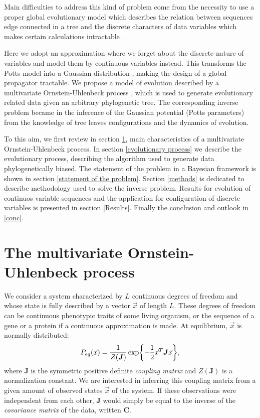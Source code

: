 \documentclass[preprint,amsmath,amssymb,superscriptaddress,showpacs,pre]{revtex4-1}
\let\originalleft\left
\let\originalright\right
\renewcommand{\left}{\mathopen{}\mathclose\bgroup\originalleft}
\renewcommand{\right}{\aftergroup\egroup\originalright}
\def\vx{\vec x}
\newcommand{\curlynormal}[1]{\exp\left\{-\frac{1}{2} #1 \right\}}
\begin{document}
Main difficulties to address  this kind of problem  come from the necessity to use  a proper global evolutionary model which describes the relation between sequences edge connected in a tree and the discrete  characters of data variables which makes certain calculations intractable \cite{entropy_paper}. 

Here we  adopt an approximation where we forget about the discrete nature of variables and model them by continuous variables instead. This transforms the Potts model into a Gaussian distribution \cite{Baldassi}, making the design of a global propagator tractable. We propose a model of evolution described by a multivariate Ornstein-Uhlenbeck process \cite{gardiner}, which is used  to generate evolutionary related data given an arbitrary phylogenetic tree. The corresponding inverse problem became in the inference of the Gaussian potential (Potts parameters) from the knowledge of tree leaves configurations and the dynamics of evolution. 

To this aim, we first review in section \ref{sec:ornstein_uhlenbeck_dynamics}, main characteristics of a multivariate Ornstein-Uhlenbeck process. In section \ref{evolutionary process} we describe the evolutionary process, describing the algorithm used to generate data phylogenetically biased. The statement of the problem in a Bayesian framework is shown in section \ref{statement of the problem}. Section \ref{methods} is dedicated to describe methodology used to solve the inverse problem. Results for evolution of continuos variable sequences and  the application for configuration of discrete variables is presented in section \ref{Results}. Finally the conclusion and outlook in \ref{conc}.



\section{The multivariate Ornstein-Uhlenbeck process}
\label{sec:ornstein_uhlenbeck_dynamics}

We consider a system characterized by $L$ continuous degrees of freedom and whose state is fully described by a vector $\vx$ of length $L$. 
These degrees of freedom can be continuous phenotypic traits of some living organism, or the sequence of a gene or a protein if a continuous approximation is made. 
At equilibrium, $\vx$ is normally distributed:
\begin{equation}
	P_{eq}(\vx) = \frac{1}{Z(\bm{J})}\curlynormal{\vx^T\bm{J}\vx},
	\label{eq:eq_distribution}
\end{equation}
where $\bm{J}$ is the symmetric positive definite \emph{coupling matrix} and $Z(\bm{J})$ is a normalization constant. 
We are interested in inferring this coupling matrix from a given amount of observed states $\vx$ of the system.
If these observations were independent from each other, $\bm{J}$ would simply be equal to the inverse of the \emph{covariance matrix} of the data, written $\bm{C}$. 
\end{document}
